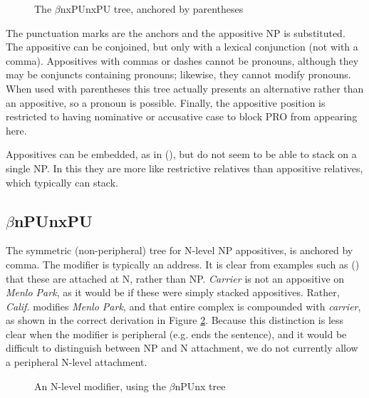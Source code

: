\begin{figure}[hbt]
\centering
\hspace{0.0in}
\caption{The $\beta$nxPUnxPU tree, anchored by parentheses}
\label{nxPUnxPU}
\end{figure}


The punctuation marks are the anchors and the appositive NP is
substituted. The appositive can be conjoined, but only with a lexical
conjunction (not with a comma). Appositives with commas or dashes
cannot be pronouns, although they may be conjuncts containing
pronouns; likewise, they cannot modify pronouns.  When used with
parentheses this tree actually presents an alternative rather than an
appositive, so a pronoun is possible. Finally, the appositive position
is restricted to having nominative or accusative case to block PRO
from appearing here.

Appositives can be embedded, as in (), but do not seem to be
able to stack on a single NP. In this they are more like restrictive
relatives than appositive relatives, which typically can stack.


\subsection{$\beta$nPUnxPU}

The symmetric (non-peripheral) tree for N-level NP appositives, is
anchored by comma. The modifier is typically an address.  It is clear
from examples such as () that these are attached at N, rather
than NP. {\it Carrier } is not an appositive on {\it Menlo Park}, as it
would be if these were simply stacked appositives. Rather, {\it
Calif.} modifies {\it Menlo Park}, and that entire complex is
compounded with {\it carrier}, as shown in the correct derivation in
Figure \ref{nPUnx}. Because this distinction is less clear when the
modifier is peripheral (e.g. ends the sentence), and it would be
difficult to distinguish between NP and N attachment, we do not
currently allow a peripheral N-level attachment.


\begin{figure}[hbt]
\centering
\hspace{0.0in}
\caption{An N-level modifier, using the $\beta$nPUnx tree}
\label{nPUnx}
\end{figure}

